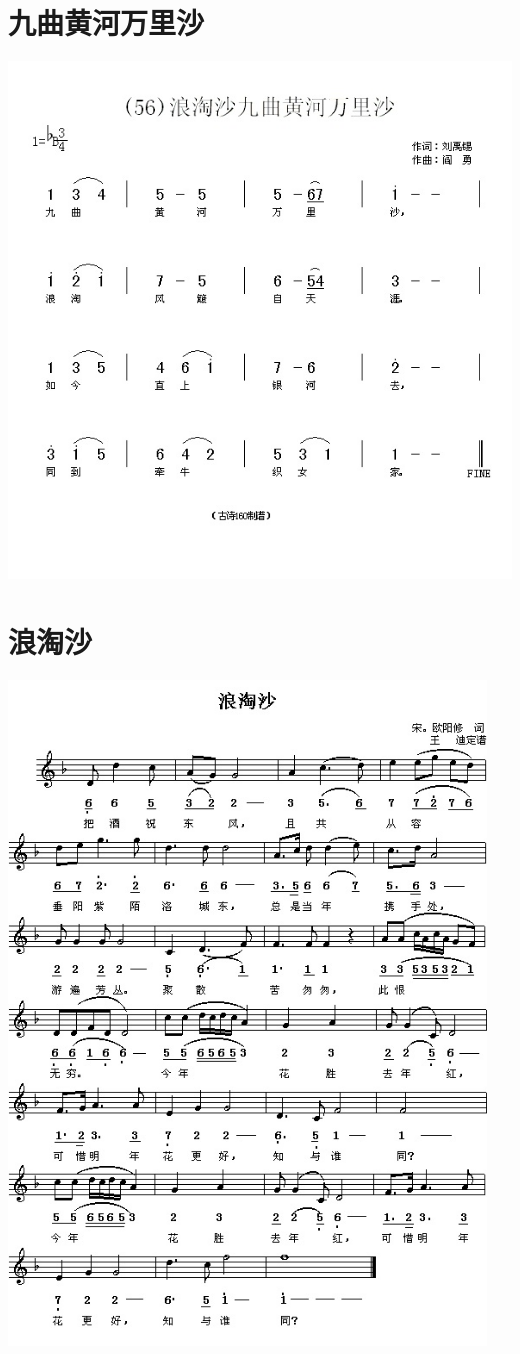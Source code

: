 \documentclass[cn,pad,twocol]{elegantbook}
\begin{document}
\section{九曲黄河万里沙}
    \includegraphics[width=\textwidth]{dongxiao/20200808-浪淘沙-九曲黄河万里沙-刘禹锡.jpg}
\section{浪淘沙}
    \includegraphics[width=0.95\textwidth]{dongxiao/20200808-浪淘沙-欧阳修.jpg}
\end{document}
